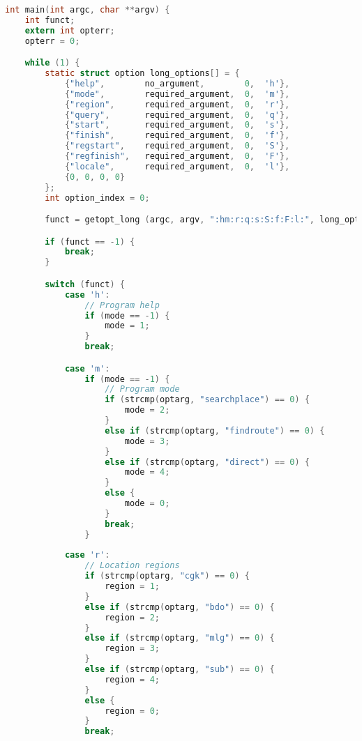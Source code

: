 \begin{lstlisting}[label={appdx:A-main}, language=C, caption=Fungsi utama perkakas (\texttt{main})]
int main(int argc, char **argv) {
    int funct;
    extern int opterr;
    opterr = 0;

    while (1) {
        static struct option long_options[] = {
            {"help",        no_argument,        0,  'h'},
            {"mode",        required_argument,  0,  'm'},
            {"region",      required_argument,  0,  'r'},
            {"query",       required_argument,  0,  'q'},
            {"start",       required_argument,  0,  's'},
            {"finish",      required_argument,  0,  'f'},
            {"regstart",    required_argument,  0,  'S'},
            {"regfinish",   required_argument,  0,  'F'},
            {"locale",      required_argument,  0,  'l'},
            {0, 0, 0, 0}
        };
        int option_index = 0;

        funct = getopt_long (argc, argv, ":hm:r:q:s:S:f:F:l:", long_options, &option_index);

        if (funct == -1) {
            break;
        }

        switch (funct) {
            case 'h':
                // Program help
                if (mode == -1) {
                    mode = 1;
                }
                break;

            case 'm':
                if (mode == -1) {
                    // Program mode
                    if (strcmp(optarg, "searchplace") == 0) {
                        mode = 2;
                    }
                    else if (strcmp(optarg, "findroute") == 0) {
                        mode = 3;
                    }
                    else if (strcmp(optarg, "direct") == 0) {
                        mode = 4;
                    }
                    else {
                        mode = 0;
                    }
                    break;
                }
            
            case 'r':
                // Location regions
                if (strcmp(optarg, "cgk") == 0) {
                    region = 1;
                }
                else if (strcmp(optarg, "bdo") == 0) {
                    region = 2;
                }
                else if (strcmp(optarg, "mlg") == 0) {
                    region = 3;
                }
                else if (strcmp(optarg, "sub") == 0) {
                    region = 4;
                }
                else {
                    region = 0;
                }
                break;


\end{lstlisting}
